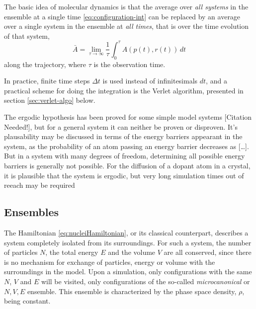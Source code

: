 \documentclass[11pt,bibliography=totoc,index=totoc]{scrbook}   %
\begin{document}
The basic idea of molecular dynamics is that the average over \emph{all systems} in the ensemble at a single time \eqref{eq:configuration-int} can be replaced by an average over a single system in the ensemble at \emph{all times}, that is over the time evolution of that system,
\begin{equation}
  \bar{A} = \lim_{\tau\to\infty} \frac{1}{\tau}\int_{0}^{\tau} A(p(t),r(t)) \,dt
  \label{eq:time-integral}
\end{equation}
along the trajectory, where $\tau$ is the observation time. 

In practice, finite time steps $\Delta t$ is used instead of infinitesimals $dt$, and a practical scheme for doing
the integration is the Verlet algorithm, presented in section \ref{sec:verlet-algo} below.

The ergodic hypothesis has been proved for some simple model systems [Citation Needed!], 
but for a general system it can neither be proven or disproven. 
It's plausability may be discussed in terms of the energy barriers appearant in the system,
as the probability of an atom passing an energy barrier decreases as [\ldots]. 
But in a system with many degrees of freedom, determining all possible energy barriers is generally not possible.
For the diffusion of a dopant atom in a crystal, it is plausible that the system is ergodic, but very long
simulation times out of reeach may be required


%
\subsection{Ensembles}\label{sec:ensembles}
%

The Hamiltonian \eqref{eq:nucleiHamiltonian}, or its classical counterpart, describes a system completely isolated from its surroundings.
For such a system, the number of particles $N$, the total energy $E$ and the volume $V$ are all conserved, since there is no mechanism for exchange of particles, energy or volume with the surroundings in the model.
Upon a simulation, only configurations with the same $N$, $V$ and $E$ will be visited, only configurations of the so-called \emph{microcanonical} or $N,V,E$ ensemble. This ensemble is characterized by the phase space density, $\rho$, being constant.
\end{document}
